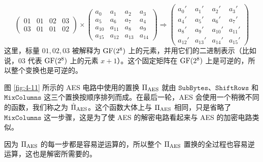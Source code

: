 \begin{snote}
\begin{enumerate}
\begin{equation}
\begin{pmatrix}
    		01 & 01 & 02 & 03\\
    		03 & 01 & 01 & 02
    	\end{pmatrix}
    	\times
    	\begin{pmatrix}
    		a_0 & a_1 & a_2 & a_3\\
    		a_5 & a_6 & a_7 & a_4\\
    		a_{10} & a_{11} & a_{8} & a_{9}\\
    		a_{15} & a_{12} & a_{13} & a_{14}
    	\end{pmatrix}
    	\Longrightarrow
    	\begin{pmatrix}
    		a_0' & a_1' & a_2' & a_3'\\
    		a_4' & a_5' & a_6' & a_7'\\
    		a_8' & a_9' & a_{10}' & a_{11}'\\
    		a_{12}' & a_{13}' & a_{14}' & a_{15}'
    	\end{pmatrix}
    \end{equation}
    这里，标量 $01,02,03$ 被解释为 ${\rm GF}(2^8)$ 上的元素，并用它们的二进制表示（比如说，$03$ 代表 ${\rm GF}(2^8)$ 上的元素 $x+1$）。这个固定矩阵在 ${\rm GF}(2^8)$ 上是可逆的，所以整个变换也是可逆的。
\end{enumerate}

图 \ref{fig:4-11} 所示的 AES 电路中使用的置换 $\Pi_{\rm AES}$ 就由 $\mathtt{SubBytes}$、$\mathtt{ShiftRows}$ 和 $\mathtt{MixColumns}$ 这三个置换按顺序排列而成。在最后一轮，AES 会使用一个稍微不同的函数，我们称之为 $\hat\Pi_{\rm AES}$。这个函数大体上与 $\Pi_{\rm AES}$ 相同，只是省略了 $\mathtt{MixColumns}$ 这一步骤，这是为了使 AES 的解密电路看起来与 AES 的加密电路类似。

因为 $\Pi_{\rm AES}$ 的每一步都是容易逆运算的，所以整个 $\Pi_{\rm AES}$ 置换的全过程也容易逆运算，这也是解密所需要的。
\end{snote}

